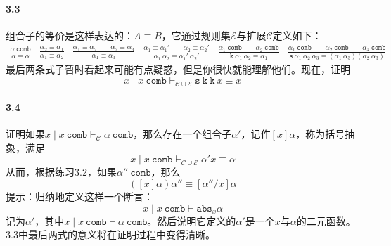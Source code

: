 \paragraph{3.3}
组合子的等价是这样表达的：$A\equiv B$，它通过规则集$\mathcal{E}$与扩展$\mathcal{C}$定义如下：
\begin{subequations}
    \begin{align}
        \frac{\alpha \ \mathtt{comb}}{\alpha \equiv \alpha} 
    \end{align}
    \begin{align}
        \frac{\alpha_2 \equiv \alpha_1}{\alpha_1 \equiv \alpha_2} 
    \end{align}
    \begin{align}
        \frac{\alpha_1 \equiv \alpha_2 \qquad \alpha_2 \equiv \alpha_3}{\alpha_1 \equiv \alpha_3} 
    \end{align}
    \begin{align}
        \frac{\alpha_1 \equiv \alpha_1' \qquad \alpha_2 \equiv \alpha_2'}{\alpha_1 \  \alpha_2 \equiv \alpha_1' \  \alpha_2'} 
    \end{align}
    \begin{align}
        \frac{\alpha_1 \ \mathtt{comb} \qquad \alpha_2 \ \mathtt{comb}}{\mathtt{k} \  \alpha_1 \  \alpha_2 \equiv \alpha_1} 
    \end{align}
    \begin{align}
        \frac{\alpha_1 \ \mathtt{comb} \qquad \alpha_2 \ \mathtt{comb} \qquad \alpha_3 \ \mathtt{comb}}{\mathtt{s} \ \alpha_1 \ \alpha_2 \ \alpha_3 \equiv (\alpha_1 \  \alpha_3)(\alpha_2 \  \alpha_3)} 
    \end{align}
\end{subequations}
最后两条式子暂时看起来可能有点疑惑，但是你很快就能理解他们。现在，证明
$$x \mid x \ \mathtt{comb} \vdash_{\mathcal{C} \cup \mathcal{E}} \mathtt{s \ k \ k} \  x \equiv x$$

\paragraph{3.4}
证明如果$x \mid x \ \mathtt{comb} \vdash_{\mathcal{C}} \alpha \ \mathtt{comb}$，那么存在一个组合子$\alpha'$，记作$[x]\alpha$，称为括号抽象，满足
$$x \mid x \ \mathtt{comb} \vdash_{\mathcal{C} \cup \mathcal{E}} \alpha' x \equiv \alpha$$
从而，根据练习3.2，如果$\alpha'' \ \mathtt{comb}$，那么
$$([x] \alpha) \alpha'' \equiv [\alpha'' / x] \alpha$$
提示：归纳地定义这样一个断言：
$$x \mid x \ \mathtt{comb} \vdash \mathtt{abs}_x \alpha$$
记为$\alpha'$，其中$x \mid x \ \mathtt{comb} \vdash \alpha \ \mathtt{comb}$。然后说明它定义的$\alpha'$是一个$x$与$\alpha$的二元函数。
3.3中最后两式的意义将在证明过程中变得清晰。

